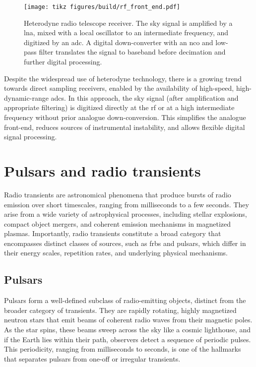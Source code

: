 \begin{figure}[h!]
	\centering
	\texttt{[image: tikz figures/build/rf\_front\_end.pdf]}
	\caption[Heterodyne receiver]{Heterodyne radio telescope receiver. The sky signal is amplified by a \gls{lna}, mixed with a local oscillator to an intermediate frequency, and digitized by an \gls{adc}. A digital down-converter with an \gls{nco} and low-pass filter translates the signal to baseband before decimation and further digital processing.}
	\label{fig:heterodyne_receiver}
\end{figure}

Despite the widespread use of heterodyne technology, there is a growing trend towards direct sampling receivers, enabled by the availability of high-speed, high-dynamic-range \glspl{adc}. In this approach, the sky signal (after amplification and appropriate filtering) is digitized directly at the \gls{rf} or at a high intermediate frequency without prior analogue down-conversion. This simplifies the analogue front-end, reduces sources of instrumental instability, and allows flexible digital signal processing.

\section{Pulsars and radio transients}
\label{sec:transient_astronomy}

Radio transients are astronomical phenomena that produce bursts of radio emission over short timescales, ranging from milliseconds to a few seconds. They arise from a wide variety of astrophysical processes, including stellar explosions, compact object mergers, and coherent emission mechanisms in magnetized plasmas. Importantly, radio transients constitute a broad category that encompasses distinct classes of sources, such as \glspl{frb} and pulsars, which differ in their energy scales, repetition rates, and underlying physical mechanisms.

\subsection{Pulsars}

Pulsars form a well-defined subclass of radio-emitting objects, distinct from the broader category of transients. They are rapidly rotating, highly magnetized neutron stars that emit beams of coherent radio waves from their magnetic poles. As the star spins, these beams sweep across the sky like a cosmic lighthouse, and if the Earth lies within their path, observers detect a sequence of periodic pulses. This periodicity, ranging from milliseconds to seconds, is one of the hallmarks that separates pulsars from one-off or irregular transients.

